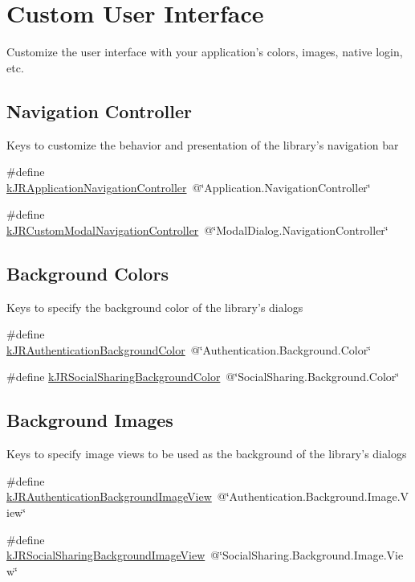 \hypertarget{group__custom_interface}{
\section{Custom User Interface}
\label{group__custom_interface}
}


Customize the user interface with your application's colors, images, native login, etc.  


\subsection*{Navigation Controller}
\label{_amgrp878b2c7e666df330bdc4f68ee81a024d}
Keys to customize the behavior and presentation of the library's navigation bar

\label{group__custom_interface_customInterfaceKeys}
\hypertarget{group__custom_interface_customInterfaceKeys}{}
 \begin{DoxyCompactItemize}
\item 
\#define \hyperlink{group__custom_interface_ga7bace8001f549fc2ecbe84d967d24d22}{kJRApplicationNavigationController}~@\char`\"{}Application.NavigationController\char`\"{}
\item 
\#define \hyperlink{group__custom_interface_ga679ad3bb2027bd7411ab78498b35d1e5}{kJRCustomModalNavigationController}~@\char`\"{}ModalDialog.NavigationController\char`\"{}
\end{DoxyCompactItemize}
\subsection*{Background Colors}
\label{_amgrpdc55f9575e9d43d9a94ff15dba82dbbc}
 Keys to specify the background color of the library's dialogs \begin{DoxyCompactItemize}
\item 
\#define \hyperlink{group__custom_interface_gacfe014997457d27386eff69eb731ce0f}{kJRAuthenticationBackgroundColor}~@\char`\"{}Authentication.Background.Color\char`\"{}
\item 
\#define \hyperlink{group__custom_interface_ga404751db179428ee64bbe2fda663efa6}{kJRSocialSharingBackgroundColor}~@\char`\"{}SocialSharing.Background.Color\char`\"{}
\end{DoxyCompactItemize}
\subsection*{Background Images}
\label{_amgrp2c0408c2c62eea12966fb29a94739702}
 Keys to specify image views to be used as the background of the library's dialogs \begin{DoxyCompactItemize}
\item 
\#define \hyperlink{group__custom_interface_ga68a4950b1b3834ce60218856f596059f}{kJRAuthenticationBackgroundImageView}~@\char`\"{}Authentication.Background.Image.View\char`\"{}
\item 
\#define \hyperlink{group__custom_interface_gafe08832d1e15427e1bc1c8c1e3a4c641}{kJRSocialSharingBackgroundImageView}~@\char`\"{}SocialSharing.Background.Image.View\char`\"{}
\end{DoxyCompactItemize}
